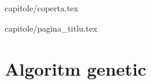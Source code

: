 \documentclass[12pt,oneside]{report}
\begin{document}
 {capitole/coperta.tex}

 {capitole/pagina_titlu.tex}





\tableofcontents

\setcounter{section}{0}
\chapter*{Algoritm genetic}



	
\end{document}
